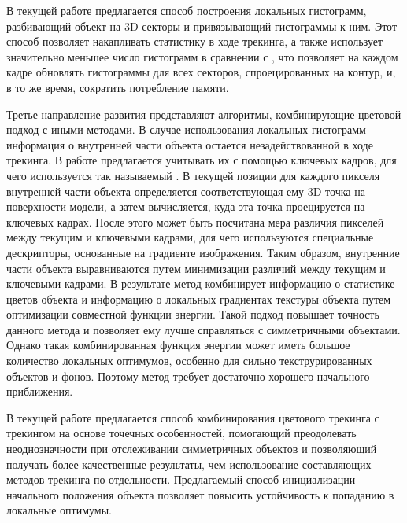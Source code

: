 В текущей работе предлагается способ построения локальных гистограмм,
разбивающий объект на 3D-секторы и привязывающий гистограммы к ним.
Этот способ позволяет накапливать статистику в ходе трекинга, а также использует
значительно меньшее число гистограмм в сравнении с \cite{Tjaden2017}, что
позволяет на каждом кадре обновлять гистограммы для всех секторов,
спроецированных на контур, и, в то же время, сократить потребление
памяти.

Третье направление развития представляют алгоритмы, комбинирующие
цветовой подход с иными методами.
В случае использования локальных гистограмм информация о внутренней части
объекта остается незадействованной в ходе трекинга.
В работе \cite{Zhong2018} предлагается учитывать их с помощью ключевых
кадров, для чего используется так называемый .
В текущей позиции для каждого пикселя внутренней части объекта
определяется соответствующая ему 3D-точка на поверхности модели,
а затем вычисляется, куда эта точка проецируется на ключевых кадрах.
После этого может быть посчитана мера различия пикселей между текущим и
ключевыми кадрами, для чего используются специальные дескрипторы, основанные на
градиенте изображения.
Таким образом, внутренние части объекта выравниваются путем минимизации
различий между текущим и ключевыми кадрами.
В результате метод \cite{Zhong2018} комбинирует информацию о статистике цветов
объекта и информацию о локальных градиентах текстуры объекта путем оптимизации
совместной функции энергии.
Такой подход повышает точность данного метода и позволяет ему лучше справляться
с симметричными объектами.
Однако такая комбинированная функция энергии может иметь большое количество
локальных оптимумов, особенно для сильно текструрированных объектов и фонов.
Поэтому метод \cite{Zhong2018} требует достаточно хорошего начального
приближения.

В текущей работе предлагается способ комбинирования цветового трекинга с
трекингом на основе точечных особенностей, помогающий преодолевать
неоднозначности при отслеживании симметричных объектов и позволяющий получать
более качественные результаты, чем использование составляющих методов
трекинга по отдельности.
Предлагаемый способ инициализации начального положения объекта позволяет
повысить устойчивость к попаданию в локальные оптимумы.
